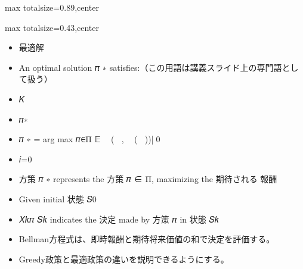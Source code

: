 \begin{minipage}[t]{0.58\textwidth}
\begin{adjustbox}{max totalsize={\textwidth}{0.89\textheight},center}
\begin{minipage}{\textwidth}
\end{minipage}
\end{adjustbox}
\end{minipage}


\clearpage
{}
\begin{minipage}[t]{0.405\textwidth}
\begin{adjustbox}{max totalsize={\textwidth}{0.43\textheight},center}
\begin{minipage}{\textwidth}\scriptsize
{}\begin{itemize}
\item 最適解
\item An optimal solution 𝜋 ∗ satisfies:（この用語は講義スライド上の専門語として扱う）
\item 𝐾
\item 𝜋∗
\item 𝜋 ∗ = arg max 𝜋∈Π 𝔼 ෍ 𝑅(𝑆𝑖 , 𝑋𝑖 (𝑆𝑖 ))|𝑆0
\item 𝑖=0
\item 方策 𝜋 ∗ represents the 方策 𝜋 ∈ Π, maximizing the 期待される 報酬
\item Given initial 状態 𝑆0
\item 𝑋𝑘𝜋 𝑆𝑘 indicates the 決定 made by 方策 𝜋 in 状態 𝑆𝑘
\end{itemize}\begin{itemize}
\item Bellman方程式は、即時報酬と期待将来価値の和で決定を評価する。
\item Greedy政策と最適政策の違いを説明できるようにする。
\end{itemize}
\end{minipage}
\end{adjustbox}
\end{minipage}\hfill
